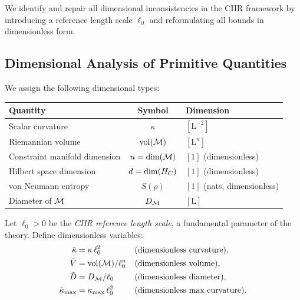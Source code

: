 We identify and repair all dimensional inconsistencies in the CIIR
framework by introducing a reference length scale $\ell_0$ and
reformulating all bounds in dimensionless form.

\subsection{Dimensional Analysis of Primitive Quantities}

\begin{definition}\label{def:12.4}
We assign the following dimensional types:
\begin{center}
\begin{tabular}{lcl}
  \toprule
  \textbf{Quantity} & \textbf{Symbol} & \textbf{Dimension} \\
  \midrule
  Scalar curvature & $\kappa$ & $[\mathrm{L}^{-2}]$ \\
  Riemannian volume & $\mathrm{vol}(\mathcal{M})$ & $[\mathrm{L}^n]$ \\
  Constraint manifold dimension & $n = \dim(\mathcal{M})$ & $[1]$ (dimensionless) \\
  Hilbert space dimension & $d = \dim(H_C)$ & $[1]$ (dimensionless) \\
  von Neumann entropy & $S(\rho)$ & $[1]$ (nats, dimensionless) \\
  Diameter of $\mathcal{M}$ & $D_{\mathcal{M}}$ & $[\mathrm{L}]$ \\
  \bottomrule
\end{tabular}
\end{center}
\end{definition}

\begin{definition}\label{def:12.5}
Let $\ell_0 > 0$ be the \emph{CIIR reference length scale}, a
fundamental parameter of the theory.  Define dimensionless variables:
\begin{align}
  \tilde{\kappa} &= \kappa\,\ell_0^2  &&\text{(dimensionless curvature)},
    \label{eq:kappa-tilde} \\
  \tilde{V} &= \mathrm{vol}(\mathcal{M}) / \ell_0^n
    &&\text{(dimensionless volume)},
    \label{eq:V-tilde} \\
  \tilde{D} &= D_{\mathcal{M}} / \ell_0
    &&\text{(dimensionless diameter)},
    \label{eq:D-tilde} \\
  \tilde{\kappa}_{\max} &= \kappa_{\max}\,\ell_0^2
    &&\text{(dimensionless max curvature)}.
    \label{eq:kappa-max-tilde}
\end{align}
\end{definition}

